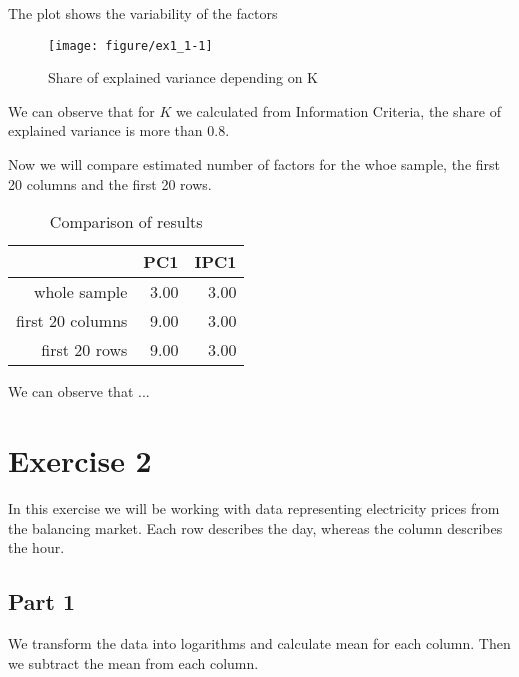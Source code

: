 \documentclass[12pt, a4paper]{article}\usepackage[]{graphicx}\usepackage[]{color}
\makeatletter
\def\maxwidth{ %
  \ifdim\Gin@nat@width>\linewidth
    \linewidth
  \else
    \Gin@nat@width
  \fi
}
\newenvironment{knitrout}{}{} %
\makeatother
\begin{document}
The plot shows the variability of the factors
\begin{knitrout}
\color{fgcolor}\begin{figure}[H]

{\centering \texttt{[image: figure/ex1\_1-1]} 

}

\caption[Share of explained variance depending on K]{Share of explained variance depending on K}\label{fig:ex1.1}
\end{figure}


\end{knitrout}
We can observe that for $K$ we calculated from Information Criteria, the share of explained variance is more than 0.8.


Now we will compare estimated number of factors for the whoe sample, the first 20 columns and the first 20 rows.
\begin{table}[H]
\centering
\begin{tabular}{rrr}
  \hline
  & PC1 & IPC1 \\ 
  \hline
whole sample & 3.00 & 3.00 \\ 
  first 20 columns & 9.00 & 3.00 \\ 
  first 20 rows & 9.00 & 3.00 \\ 
   \hline
\end{tabular}
\caption{Comparison of results} 
\label{tab:por}
\end{table}


We can observe that ...




\section{Exercise 2}

In this exercise we will be working with data representing electricity prices from the balancing market. Each row describes the day, whereas the column describes the hour.

\subsection{Part 1}
We transform the data into logarithms and calculate mean for each column. Then we subtract the mean from each column.
\end{document}
